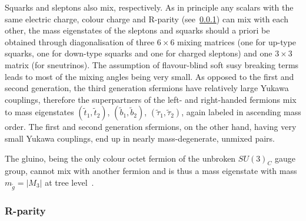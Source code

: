 %

Squarks and sleptons also mix, respectively. As in principle any scalars with the same electric charge, colour charge and R-parity (see~\cref{sec:rparity}) can mix with each other, the mass eigenstates of the sleptons and squarks should a priori be obtained through diagonalisation of three $6\times 6$ mixing matrices (one for up-type squarks, one for down-type squarks and one for charged sleptons) and one $3\times 3$ matrix (for sneutrinos). The assumption of flavour-blind soft \gls{susy} breaking terms leads to most of the mixing angles being very small. As opposed to the first and second generation, the third generation sfermions have relatively large Yukawa couplings, therefore the superpartners of the left- and right-handed fermions mix to mass eigenstates $(\tilde{t}_1,\tilde{t}_2)$, $(\tilde{b}_1,\tilde{b}_2)$, $(\tilde{\tau}_1,\tilde{\tau}_2)$, again labeled in ascending mass order. The first and second generation sfermions, on the other hand, having very small Yukawa couplings, end up in nearly mass-degenerate, unmixed pairs.

The gluino, being the only colour octet fermion of the unbroken $SU(3)_C$ gauge group, cannot mix with another fermion and is thus a mass eigenstate with mass $m_{\tilde{g}} = \vert M_3 \vert$ at tree level~\cite{Martin:1997ns,baer_tata_2006}.

\subsubsection{R-parity}\label{sec:rparity}

